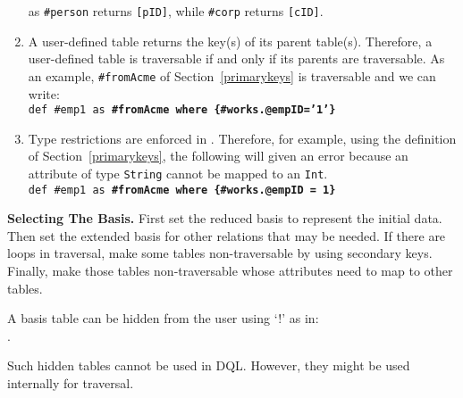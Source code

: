 \begin{enumerate}
as \texttt{\#person} returns \texttt{[pID]}, while \texttt{\#corp} returns \texttt{[cID]}.
	\item A user-defined table returns the key(s) of its parent table(s). Therefore, a user-defined table is traversable if and only if its parents are traversable. As an example, \texttt{\#fromAcme} of Section~\ref{primarykeys} is traversable and we can write:\\ %
	\texttt{\small \colorbox{Light}{def \#emp1 as \bfseries\#fromAcme where \{\#works.@empID='1'\}}}
	
	\item Type restrictions are enforced in \dsl. Therefore, for example, using the definition of Section~\ref{primarykeys}, the following will given an error because an attribute of type \texttt{String} cannot be mapped to an \texttt{Int}.\\
	\texttt{\small \colorbox{Light}{def \#emp1 as \bfseries\#fromAcme where \{\#works.@empID = 1\}}}
\end{enumerate}

\textbf{Selecting The Basis.} %
First set the reduced basis to represent the initial data.
Then set the extended basis for other relations that may be needed. If there are loops in traversal, make some tables non-traversable by using secondary keys. Finally, make those tables non-traversable whose attributes need to map to other tables. 

A basis table can be hidden from the user using `!' as in:\\
.

Such hidden tables cannot be used in DQL. However, they might be used internally for traversal.

